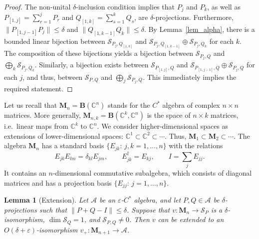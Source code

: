 \documentclass[12pt]{article}
\newcommand{\CC}{\mathbb{C}}
\newcommand{\calA}{\mathcal{A}}
\newcommand{\calS}{\mathcal{S}}
\newcommand{\Bo}{\mathbf{B}}
\newcommand*{\Ma}[1]{\mathbf{M}_{#1}}
\newcommand{\eps}{\varepsilon}
\renewcommand{\le}{\leqslant}
\newtheorem{Lemma}[Theorem]{Lemma}
\newtheorem[definition]{Definition}[Theorem]{Definition}
\newtheorem[remark]{Example}[Theorem]{Example}
\newtheorem[remark]{Remark}[Theorem]{Remark}
\newtheorem[remark]{Question}[Theorem]{Open question}
\newtheorem*[definition]{definition}{Definition}
\newtheorem*[remark]{example}{Example}
\newtheorem*[remark]{remark}{Remark}
\newtheorem*[remark]{question}{Open question}
\numberwithin{equation}{section}
\begin{document}
\begin{proof}
The non-unital $\delta$-inclusion condition implies that $P_j$ and $P_k$, as well as $P_{[1,j]}=\sum_{r=1}^{j}P_r$ and $Q_{[1,k]}=\sum_{s=1}^{k}Q_s$, are $\delta$-projections. Furthermore, $\|P_{[1,j-1]}P_j\|\le\delta$ and $\|Q_{[1,k-1]}Q_k\|\le\delta$. By Lemma~\ref{lem_alpha}, there is a bounded linear bijection between $\calS_{P_j,Q_{[1,k]}}$ and $\calS_{P_j,Q_{[1,k-1]}}\oplus\calS_{P_j,Q_k}$ for each $k$. The composition of these bijections yields a bijection between $\calS_{P_j,Q}$ and $\bigoplus_{k}\calS_{P_j,Q_k}$. Similarly, a bijection exists between $\calS_{P_{[1,j]},Q}$ and $\calS_{P_{[1,j-1]},Q}\oplus\calS_{P_j,Q}$ for each $j$, and thus, between $\calS_{P,Q}$ and $\bigoplus_{j}\calS_{P_j,Q}$. This immediately implies the required statement.
\end{proof}

Let us recall that $\Ma{n}=\Bo(\CC^n)$ stands for the $C^*$ algebra of complex $n\times n$ matrices. More generally, $\Ma{n,k}=\Bo(\CC^k,\CC^n)$ is the space of $n\times k$ matrices, i.e.\ linear maps from $\CC^k$ to $\CC^n$. We consider higher-dimensional spaces as extensions of lower-dimensional spaces: $\CC^1\subset\CC^2\subset\cdots$. Thus, $\Ma{1}\subset \Ma{2}\subset\cdots$. The algebra $\Ma{n}$ has a standard basis $\{E_{jk}:\,j,k=1,\dots,n\}$ with the relations
\begin{equation}
E_{jk}E_{lm}=\delta_{kl}E_{jm},\qquad E_{jk}^\dag=E_{kj},\qquad
I=\sum_{j}E_{jj}.
\end{equation}
It contains an $n$-dimensional commutative subalgebra, which consists of diagonal matrices and has a projection basis $\{E_{jj}:\,j=1,\dots,n\}$.

\begin{Lemma}[Extension]\label{lem_extension}
Let $\calA$ be an $\eps$-$C^*$ algebra, and let $P,Q\in\calA$ be $\delta$-projections such that $\|P+Q-I\|\le\delta$. Suppose that $v\colon \Ma{n}\to\calS_{P}$ is a $\delta$-isomorphism, $\dim\calS_Q=1$, and $\calS_{P,Q}\not=0$. Then $v$ can be extended to an $O(\delta+\eps)$-isomorphism $v_+\colon\Ma{n+1}\to\calA$.
\end{Lemma}
\end{document}

